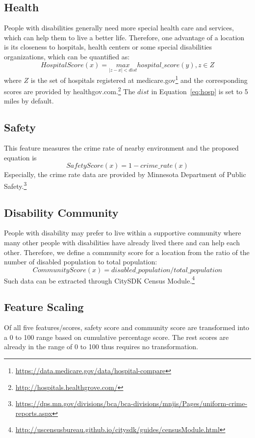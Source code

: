 \documentclass[10pt]{article}
\begin{document}
\subsection{Health}
People with disabilities generally need more special health care and services, which can help them to live a better life. Therefore, one advantage of a location is its closeness to hospitals, health centers or some special disabilities organizations, which can be quantified as:
\begin{equation}
HospitalScore(x) = \underset{|z-x|<dist}{max}hospital\_score(y), z\in Z
\label{eq:hosp}
\end{equation}
 where $Z$ is the set of hospitals registered at medicare.gov\footnote{\url{https://data.medicare.gov/data/hospital-compare}} and the corresponding scores are provided by healthgov.com.\footnote{\url{http://hospitals.healthgrove.com/}} The $dist$ in Equation~\ref{eq:hosp} is set to 5 miles by default.
 
\subsection{Safety}
This feature measures the crime rate of nearby environment and the proposed equation is
\begin{equation}
SafetyScore(x) = 1 - crime\_rate(x)
\end{equation}
Especially, the crime rate data are provided by Minnesota Department of Public Safety.\footnote{\url{https://dps.mn.gov/divisions/bca/bca-divisions/mnjis/Pages/uniform-crime-reports.aspx}} 

\subsection{Disability Community}
People with disability may prefer to live within a supportive community where many other people with disabilities have already lived there and can help each other. Therefore, we define a community score for a location from the ratio of the number of disabled population to total population:
\begin{equation}
CommunityScore(x) = disabled\_population/total\_population
\end{equation}
 Such data can be extracted through CitySDK Census Module.\footnote{\url{http://uscensusbureau.github.io/citysdk/guides/censusModule.html}}
 
 \subsection{Feature Scaling}
Of all five features/scores, safety score and community score are transformed into a 0 to 100 range based on cumulative percentage score. The rest scores are already in the range of 0 to 100 thus requires no transformation.
 
\end{document}
